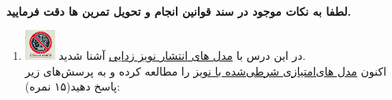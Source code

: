 \documentclass[12pt]{article}
\begin{document}
\fontsize{12pt}{14pt}\selectfont



\\
{\fontsize{14}{22}\selectfont \textbf{لطفا به نکات موجود در سند قوانین انجام و تحویل تمرین ها دقت فرمایید. }}

\begin{enumerate}

    \section*{سوالات تئوری}
    \item \includegraphics[width=1cm]{figs/Forbidden_AI.jpg}
    در این درس با \href{https://arxiv.org/pdf/2006.11239}{مدل های انتشار نویز زدایی} آشنا شدید.\\
    اکنون \href{https://arxiv.org/pdf/2006.09011}{مدل های‌امتیازی شرطی‌شده با نویز} را مطالعه کرده و به پرسش‌های زیر پاسخ دهید(۱۵ نمره):
    

\end{enumerate}
\end{document}

